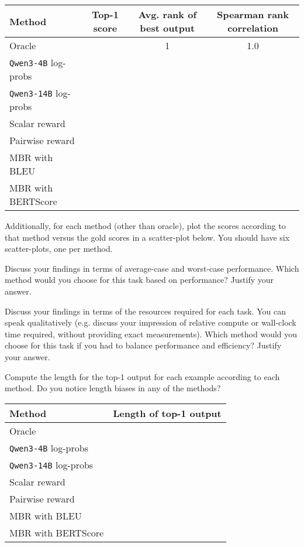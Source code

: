 \documentclass{article}
\begin{document}
\begin{solve}

\begin{tabular}{lccc}
\toprule
Method & Top-1 score & Avg. rank of best output & Spearman rank correlation \\ \toprule
Oracle & & 1 & 1.0 \\ 
\texttt{Qwen3-4B} log-probs & & & \\ 
\texttt{Qwen3-14B} log-probs & & & \\
Scalar reward & & & \\
Pairwise reward & & & \\
MBR with BLEU & & & \\
MBR with BERTScore & & & \\
\bottomrule
\end{tabular}
\end{solve}


Additionally, for each method (other than oracle), plot the scores according to that method versus the gold scores in a scatter-plot below. You should have six scatter-plots, one per method. 
\begin{solve}
    
\end{solve}

Discuss your findings in terms of average-case and worst-case performance. Which method would you choose for this task based on performance? Justify your answer.
\begin{solve}
    
\end{solve}


Discuss your findings in terms of the resources required for each task. You can speak qualitatively (e.g. discuss your impression of relative compute or wall-clock time required, without providing exact measurements). Which method would you choose for this task if you had to balance performance and efficiency? Justify your answer.
\begin{solve}
    
\end{solve}


Compute the length for the top-1 output for each example according to each method. Do you notice length biases in any of the methods? 
\begin{solve}

\begin{tabular}{lc}
\toprule
Method & Length of top-1 output \\ \toprule
Oracle & \\ 
\texttt{Qwen3-4B} log-probs &  \\ 
\texttt{Qwen3-14B} log-probs &  \\
Scalar reward & \\
Pairwise reward & \\
MBR with BLEU & \\
MBR with BERTScore & \\
\bottomrule
\end{tabular}
\end{solve}
\end{document}

